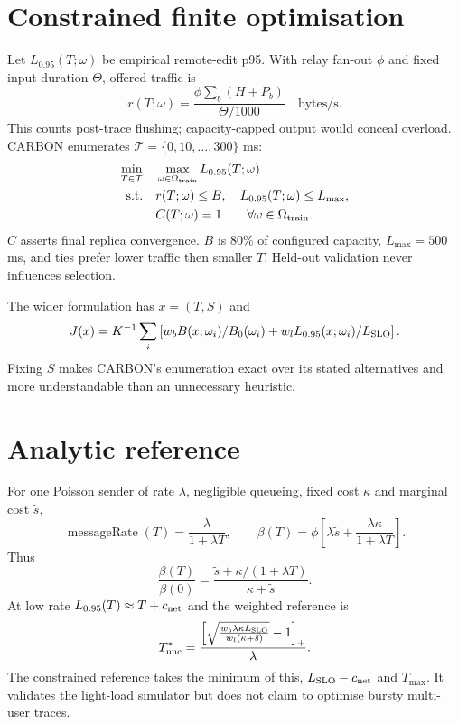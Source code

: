 \documentclass[10pt]{article}
\begin{document}
\clearpage
\section{Constrained finite optimisation}
Let $L_{0.95}(T;\omega)$ be empirical remote-edit p95. With relay fan-out $\phi$ and fixed input duration $\Theta$, offered traffic is
\begin{equation}
r(T;\omega)=\frac{\phi\sum_b(H+P_b)}{\Theta/1000}\quad\mathrm{bytes/s}.
\end{equation}
This counts post-trace flushing; capacity-capped output would conceal overload. CARBON enumerates $\mathcal T=\{0,10,\ldots,300\}$ ms:
\begin{align}
\min_{T\in\mathcal T}\quad&\max_{\omega\in\Omega_{\rm train}}L_{0.95}(T;\omega)\\
\text{s.t.}\quad&r(T;\omega)\le B,\quad L_{0.95}(T;\omega)\le L_{\max},\\
&C(T;\omega)=1\qquad\forall\omega\in\Omega_{\rm train}.
\end{align}
$C$ asserts final replica convergence. $B$ is 80\% of configured capacity, $L_{\max}=500$ ms, and ties prefer lower traffic then smaller $T$. Held-out validation never influences selection.

The wider formulation has $x=(T,S)$ and
\begin{equation}
J(x)=K^{-1}\sum_i\left[w_bB(x;\omega_i)/B_0(\omega_i)+
w_lL_{0.95}(x;\omega_i)/L_{\rm SLO}\right].
\end{equation}
Fixing $S$ makes CARBON's enumeration exact over its stated alternatives and more understandable than an unnecessary heuristic.

\section{Analytic reference}
For one Poisson sender of rate $\lambda$, negligible queueing, fixed cost $\kappa$ and marginal cost $\tilde s$,
\begin{equation}
\operatorname{messageRate}(T)=\frac{\lambda}{1+\lambda T},\qquad
\beta(T)=\phi\left[\lambda\tilde s+\frac{\lambda\kappa}{1+\lambda T}\right].
\end{equation}
Thus
\begin{equation}
\frac{\beta(T)}{\beta(0)}=\frac{\tilde s+\kappa/(1+\lambda T)}{\kappa+\tilde s}.
\end{equation}
At low rate $L_{0.95}(T)\approx T+c_{\rm net}$ and the weighted reference is
\begin{equation}
T_{\rm unc}^*=\frac{\left[\sqrt{\frac{w_b\lambda\kappa L_{\rm SLO}}
{w_l(\kappa+\tilde s)}}-1\right]_+}{\lambda}.
\end{equation}
The constrained reference takes the minimum of this, $L_{\rm SLO}-c_{\rm net}$ and $T_{\max}$. It validates the light-load simulator but does not claim to optimise bursty multi-user traces.
\end{document}
